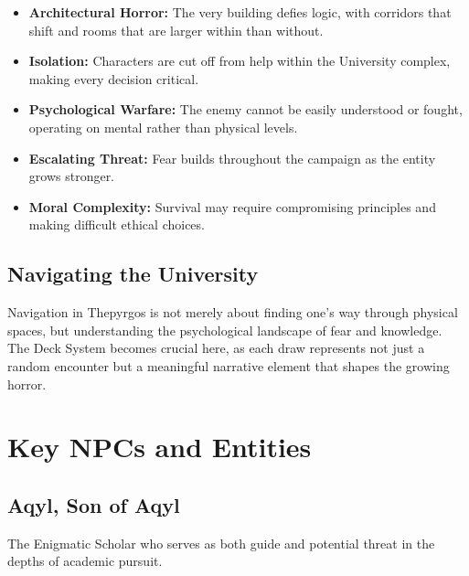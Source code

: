 \documentclass[11pt]{article}
\begin{document}
\begin{itemize}
\item \textbf{Architectural Horror:} The very building defies logic, with corridors that shift and rooms that are larger within than without.
\item \textbf{Isolation:} Characters are cut off from help within the University complex, making every decision critical.
\item \textbf{Psychological Warfare:} The enemy cannot be easily understood or fought, operating on mental rather than physical levels.
\item \textbf{Escalating Threat:} Fear builds throughout the campaign as the entity grows stronger.
\item \textbf{Moral Complexity:} Survival may require compromising principles and making difficult ethical choices.
\end{itemize}

\subsection{Navigating the University}

Navigation in Thepyrgos is not merely about finding one's way through physical spaces, but understanding the psychological landscape of fear and knowledge. The Deck System becomes crucial here, as each draw represents not just a random encounter but a meaningful narrative element that shapes the growing horror.

\section{Key NPCs and Entities}

\subsection{Aqyl, Son of Aqyl}

The Enigmatic Scholar who serves as both guide and potential threat in the depths of academic pursuit.
\end{document}
